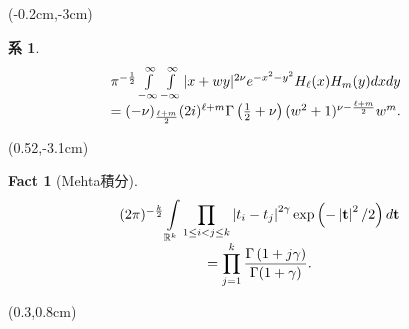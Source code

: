 \documentclass[pdf,notes]{beamer}
\newtheorem*{fact*}{Fact}
\newtheorem{cor}{系}
\begin{document}
\begin{frame}
		\scriptsize
		\setcounter{cor}{0}
	\begin{textblock*}{0.5\textwidth}(-0.2cm,-3cm)
	\begin{cor}\label{cor:int-xzy-hh}
		{\tiny
		\begin{equation*}
			\kern-0.2cm
			\begin{array}[]{c}
				\pi^{-\frac{1}{2}}\int_{- \infty}^{\infty} \int_{- \infty}^{\infty} | x + w y |^{2 \nu} e^{-
			x^2 - y^2} H_\ell (x) H_m (y) d x d y \\= (- \nu)_{\frac{\ell + m}{2}}  (2i)^{\ell + m} \Gamma \left( \frac{1}{2} + \nu \right)
			(w^2 + 1)^{\nu - \frac{\ell + m}{2}} w^m .
			\end{array}
		\end{equation*}
	}
	\end{cor}
	\end{textblock*}
	\begin{textblock*}{0.5\textwidth}(0.52\textwidth,-3.1cm)
		\begin{fact*}[Mehta積分]
			{\tiny
		\begin{equation*}
			\begin{array}[]{c}
			{(2\pi)^{-\frac{k}{2}}}\displaystyle\int_{\mathbb{R}^k}\prod_{1\le i<j\le k}\myabs{t_i-t_j}^{2\gamma}\exp\left( -\myabs{\mathbf{t}}^2/2 \right)d\mathbf{t}\\
			=\displaystyle\prod_{j=1}^k\frac{\Gamma\left( 
			1+j\gamma\right)}{\Gamma(1+\gamma)}.
			\end{array}
		\end{equation*}
	}
		\end{fact*}
	\end{textblock*}
	\begin{textblock*}{0.5\textwidth}(0.3\textwidth,0.8cm)
		\tiny
		\xymatrixcolsep{5pc}
		\xymatrixrowsep{3pc}
\end{textblock*}
\end{frame}
\end{document}
